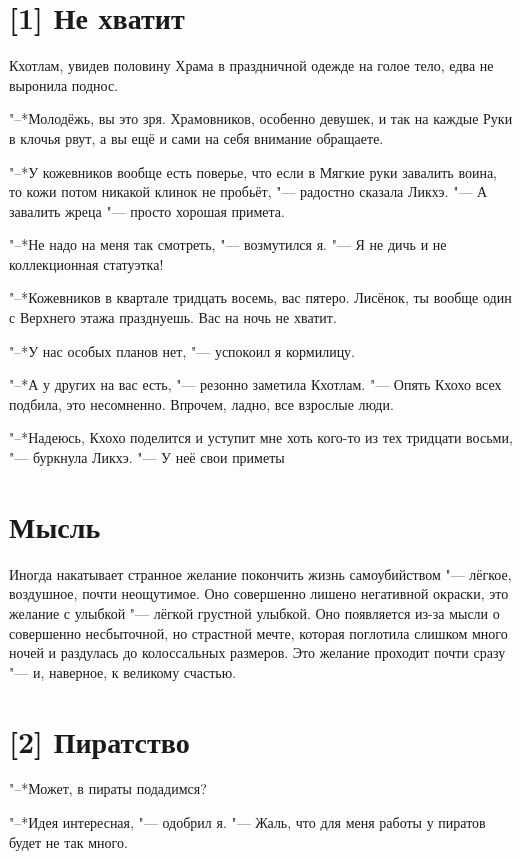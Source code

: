 \section{[1] Не хватит}

Кхотлам, увидев половину Храма в праздничной одежде на голое тело, едва не выронила поднос.

"--*Молодёжь, вы это зря.
Храмовников, особенно девушек, и так на каждые Руки в клочья рвут, а вы ещё и сами на себя внимание обращаете.

"--*У кожевников вообще есть поверье, что если в Мягкие руки завалить воина, то кожи потом никакой клинок не пробьёт, "--- радостно сказала Ликхэ.
"--- А завалить жреца "--- просто хорошая примета.

"--*Не надо на меня так смотреть, "--- возмутился я.
"--- Я не дичь и не коллекционная статуэтка!

"--*Кожевников в квартале тридцать восемь, вас пятеро.
Лисёнок, ты вообще один с Верхнего этажа празднуешь.
Вас на ночь не хватит.

"--*У нас особых планов нет, "--- успокоил я кормилицу.

"--*А у других на вас есть, "--- резонно заметила Кхотлам.
"--- Опять Кхохо всех подбила, это несомненно.
Впрочем, ладно, все взрослые люди.

"--*Надеюсь, Кхохо поделится и уступит мне хоть кого-то из тех тридцати восьми, "--- буркнула Ликхэ.
"--- У неё свои приметы\ldotst

\section{Мысль}

Иногда накатывает странное желание покончить жизнь самоубийством "--- лёгкое, воздушное, почти неощутимое.
Оно совершенно лишено негативной окраски, это желание с улыбкой "--- лёгкой грустной улыбкой.
Оно появляется из-за мысли о совершенно несбыточной, но страстной мечте, которая поглотила слишком много ночей и раздулась до колоссальных размеров.
Это желание проходит почти сразу "--- и, наверное, к великому счастью.

\section{[2] Пиратство}

"--*Может, в пираты подадимся?

"--*Идея интересная, "--- одобрил я.
"--- Жаль, что для меня работы у пиратов будет не так много.

